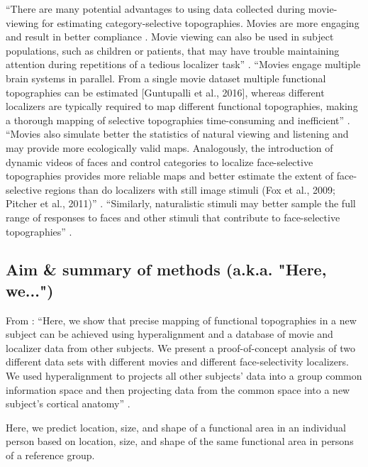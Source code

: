 %
``There are many potential advantages to using data collected during
movie-viewing for estimating category-selective topographies. Movies are more
engaging and result in better compliance \citep{vanderwal2015inscapes}. Movie
viewing can also be used in subject populations, such as children
\citep{richardson2018development} or patients, that may have trouble maintaining
attention during repetitions of a tedious localizer task''
\citep{jiahui2020predicting}.
%
``Movies engage multiple brain systems in parallel. From a single movie dataset
multiple functional topographies can be estimated [Guntupalli et al., 2016],
whereas different localizers are typically required to map different functional
topographies, making a thorough mapping of selective topographies time-consuming
and inefficient'' \citep{jiahui2020predicting}.
%
``Movies also simulate better the statistics of natural viewing and listening
and may provide more ecologically valid maps. Analogously, the introduction of
dynamic videos of faces and control categories to localize face-selective
topographies provides more reliable maps and better estimate the extent of
face-selective regions than do localizers with still image stimuli (Fox et al.,
2009; Pitcher et al., 2011)'' \citep{jiahui2020predicting}.
%
``Similarly, naturalistic stimuli may better sample the full range of responses
to faces and other stimuli that contribute to face-selective topographies''
\citep{jiahui2020predicting}.


\subsection{Aim \& summary of methods (a.k.a. "Here, we...")}

From \citet{jiahui2020predicting}: ``Here, we show that precise mapping of
functional topographies in a new subject can be achieved using hyperalignment
and a database of movie and localizer data from other subjects.
%
We present a proof-of-concept analysis of two different data sets with different
movies and different face-selectivity localizers.
%
We used hyperalignment to projects all other subjects' data into a group common
information space and then projecting data from the common space into a new
subject's cortical anatomy'' \citep{jiahui2020predicting}.


Here, we predict location, size, and shape of a functional area in an individual
person based on location, size, and shape of the same functional area in persons
of a reference group.

